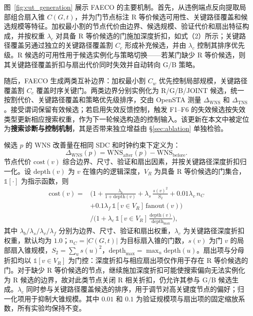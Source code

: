 \documentclass[twocolumn,10pt,fontset=windows]{ctexart}
\begin{document}
图~\ref{fig:cut_generation} 展示 FAECO 的主要机制。首先，从违例端点反向提取局部组合扇入锥 $C(G,t)$，并为门节点标注 R 等价候选可用性、关键路径覆盖和候选规模等特征。加权最小割的节点代价由边界、候选规模、验证代价和扇出特征构成，并按权重 $\lambda_c$ 对具备 R 等价候选的门施加深度折扣，如式（2）所示；关键路径覆盖另通过独立的关键路径覆盖割 $C_c$ 形成补充候选，并由 $\lambda_c$ 控制其排序优先级。R 候选的可用性用于候选实例化与策略切换——若某门缺少 R 等价候选，则其关键路径覆盖折扣与扇出代价同时失效并自动转向 G/B 策略。

随后，FAECO 生成两类互补边界：加权最小割 $C_w$ 优先控制局部规模，关键路径覆盖割 $C_c$ 覆盖时序关键门。两类边界分别实例化为 R/G/B/JOINT 候选，统一按割代价、关键路径覆盖和策略优先级排序，交由 OpenSTA 测量 $\Delta_{\mathrm{WNS}}$ 和 $\Delta_{\mathrm{TNS}}$。接受谓词保留有效候选；若启用失效反馈控制，触发 F1--F6 的失效候选按失效类型更新相应搜索权重，作为下一轮候选构造的控制输入。该更新在本文中被定位为\textbf{搜索诊断与控制机制}，其是否带来独立增益由 \S\ref{sec:ablation} 单独检验。

候选 $p$ 的 WNS 改善量在相同 SDC 和时钟约束下定义为：
\begin{equation}\label{eq:dtiming}
\Delta_{\mathrm{WNS}}(p) = \mathrm{WNS}_{\mathrm{after}}(p) - \mathrm{WNS}_{\mathrm{before}}.
\end{equation}
节点代价 $\mathrm{cost}(v)$ 综合边界、尺寸、验证和扇出因素，并按关键路径深度折扣归一化。设 $\mathrm{depth}(v)$ 为 $v$ 在锥内的逻辑深度，$V_R$ 为具备 R 等价候选的门集合，$\mathbb{1}[\cdot]$ 为指示函数，则
{\small
\begin{equation}
\label{eq:cost}
\begin{aligned}
\mathrm{cost}(v) ={}& \Big(1 + \frac{\lambda_b}{1+\mathrm{depth}(v)}
 + \lambda_s\,\frac{s(v)^2}{S_2}
 + 0.01\lambda_v\,n_C \\
 &+ 0.1\lambda_f\,\mathbb{1}[v{\in}V_R]\,\mathrm{fanout}(v)\Big) \\
 &\Big/\Big(1 + \lambda_c\,\mathbb{1}[v{\in}V_R]\,
 \frac{\mathrm{depth}(v)}{\mathrm{depth}_{\max}}\Big),
\end{aligned}
\end{equation}
}
其中 $\lambda_b/\lambda_s/\lambda_v/\lambda_f$ 分别为边界、尺寸、验证和扇出权重，$\lambda_c$ 为关键路径深度折扣权重，默认均为 $1.0$；$n_C=|C(G,t)|$ 为目标扇入锥的门数，$s(v)$ 为门 $v$ 的局部扇入锥规模，$S_2=\sum_u s(u)^2$，$\mathrm{depth}_{\max}=\max_u \mathrm{depth}(u)$。扇出项与分母折扣均以 $\mathbb{1}[v{\in}V_R]$ 为门控：深度折扣与相应扇出项仅作用于存在 R 等价候选的门。对于缺少 R 等价候选的节点，继续施加深度折扣可能使搜索偏向无法实例化为 R 候选的边界，故对此类节点关闭 R 相关折扣，仍允许其参与 G/B 候选生成。$\lambda_c$ 同时参与关键路径覆盖候选的排序，用于调节对高关键度节点的偏好；归一化项用于抑制大锥规模。其中 $0.01$ 和 $0.1$ 为验证规模项与扇出项的固定缩放系数，所有实验均保持不变。
\end{document}
